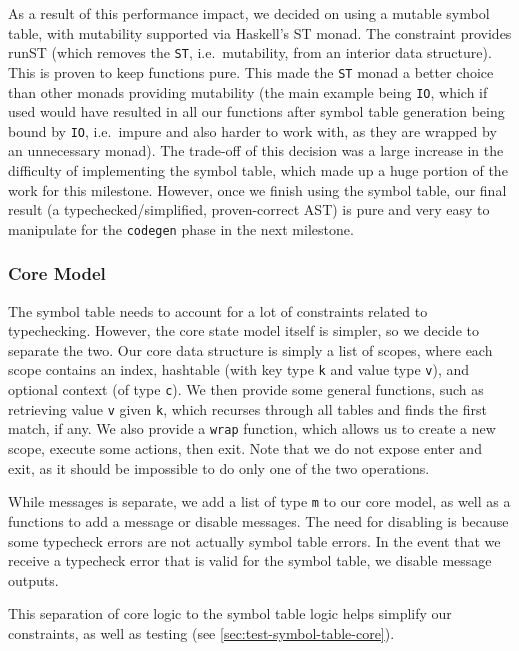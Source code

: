 \documentclass[11pt]{article}
\begin{document}
As a result of this performance impact, we decided on using a mutable
symbol table, with mutability supported via Haskell's
ST\cite{hackage:st}
monad. The constraint provides
runST\cite{hackage:runst}
(which removes the \texttt{ST}, i.e.\ mutability, from an interior
data structure). This is proven\cite{monadicstate} to keep functions pure. This made the \texttt{ST} monad a better choice than other
monads providing mutability (the main example being \texttt{IO}, which
if used would have resulted in all our functions after symbol table
generation being bound by \texttt{IO}, i.e.\ impure and also harder to
work with, as they are wrapped by an unnecessary monad). The trade-off
of this decision was a large increase in the difficulty of
implementing the symbol table, which made up a huge portion of the
work for this milestone.  However, once we finish using the symbol
table, our final result (a typechecked/simplified, proven-correct AST)
is pure and very easy to manipulate for the \texttt{codegen} phase in
the next milestone.

\subsubsection{Core Model}

The symbol table needs to account for a lot of constraints related to typechecking.
However, the core state model itself is simpler, so we decide to separate the two.
Our core data structure is simply a list of scopes, where each scope contains an index, hashtable (with key type \texttt{k} and value type \texttt{v}), and optional context (of type \texttt{c}).
We then provide some general functions, such as retrieving value \texttt{v} given \texttt{k}, which recurses through all tables and finds the first match, if any.
We also provide a \texttt{wrap} function, which allows us to create a new scope, execute some actions, then exit.
Note that we do not expose enter and exit, as it should be impossible to do only one of the two operations.

While messages is separate, we add a list of type \texttt{m} to our core model, as well as a functions to add a message or disable messages.
The need for disabling is because some typecheck errors are not actually symbol table errors.
In the event that we receive a typecheck error that is valid for the symbol table, we disable message outputs.

This separation of core logic to the symbol table logic helps simplify our constraints, as well as testing (see \ref{sec:test-symbol-table-core}).
\end{document}
